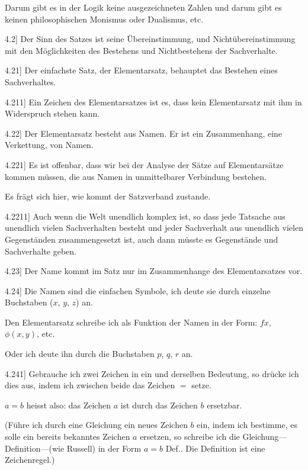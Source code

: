 \documentclass[12pt,oneside]{book}[2007/10/19]
\newcommand{\PropERef}[1]{\hyperref[PropE:#1]{#1}}
\newcommand{\PropositionG}[2]{%
  \item[\phantomsection\label{PropG:#1}\PropERef{#1}] #2%
}
\newcommand{\DPtypo}[2]{#2}
\begin{document}
\begin{propositions}
{Darum gibt es in der Logik keine ausgezeichneten
Zahlen und darum gibt es keinen philosophischen
Monismus oder Dualismus, etc.}


\PropositionG{4.2}
{Der Sinn des Satzes ist seine Übereinstimmung,
und Nichtübereinstimmung mit den Möglichkeiten
des Bestehens und Nichtbestehens der
Sachverhalte.}


\PropositionG{4.21}
{Der einfachste Satz, der Elementarsatz, behauptet
das Bestehen eines Sachverhaltes.}


\PropositionG{4.211}
{Ein Zeichen des Elementarsatzes ist es, dass
kein Elementarsatz mit ihm in Widerspruch stehen
kann.}


\PropositionG{4.22}
{Der Elementarsatz besteht aus Namen. Er ist
ein Zusammenhang, eine Verkettung, von Namen.}


\PropositionG{4.221}
{Es ist offenbar, dass wir bei der Analyse der
Sätze auf Elementarsätze kommen müssen, die aus
Namen in unmittelbarer Verbindung bestehen.

Es frägt sich hier, wie kommt der Satzverband
zustande.}


\PropositionG{4.2211}
{Auch wenn die Welt unendlich komplex ist,
so dass jede Tatsache aus unendlich vielen Sachverhalten
besteht und jeder Sachverhalt aus unendlich
vielen Gegenständen zusammengesetzt ist,
auch dann müsste es Gegenstände und Sachverhalte
geben.}


\PropositionG{4.23}
{Der Name kommt im Satz nur im Zusammenhange
des Elementarsatzes vor.}


\PropositionG{4.24}
{Die Namen sind die einfachen Symbole, ich
deute sie durch einzelne Buchstaben (\glqq{}$x$\grqq{}, \glqq{}$y$\grqq{}, \glqq{}$z$\grqq{})
an.

Den Elementarsatz schreibe ich als Funktion
der Namen in der Form: \glqq{}$fx$\grqq{}, \glqq{}$\phi(x,y\DPtypo{,}{})$\grqq{}, etc.

Oder ich deute ihn durch die Buchstaben $p$, $q$,
$r$ an.}


\PropositionG{4.241}
{Gebrauche ich zwei Zeichen in ein und derselben
Bedeutung, so drücke ich dies aus, indem
ich zwischen beide das Zeichen \glqq{}$=$\grqq{} setze.

\glqq{}$a = b$\grqq{} heisst also: das Zeichen \glqq{}$a$\grqq{} ist durch
das Zeichen \glqq{}$b$\grqq{} ersetzbar.

(Führe ich durch eine Gleichung ein neues
Zeichen \glqq{}$b$\grqq{} ein, indem ich bestimme, es solle ein
bereits bekanntes Zeichen \glqq{}$a$\grqq{} ersetzen, so schreibe
ich die Gleichung---Definition---(wie Russell) in
der Form \glqq{}$a = b$ Def.\grqq{}. Die Definition ist eine
Zeichenregel.)}



\end{propositions}
\end{document}
